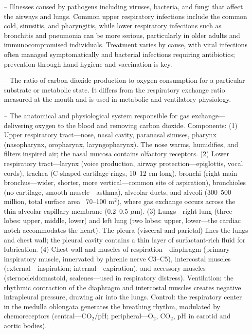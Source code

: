 -- Illnesses caused by pathogens including viruses, bacteria, and fungi that affect the airways and lungs. Common upper respiratory infections include the common cold, sinusitis, and pharyngitis, while lower respiratory infections such as bronchitis and pneumonia can be more serious, particularly in older adults and immunocompromised individuals. Treatment varies by cause, with viral infections often managed symptomatically and bacterial infections requiring antibiotics; prevention through hand hygiene and vaccination is key.

-- The ratio of carbon dioxide production to oxygen consumption for a particular substrate or metabolic state. It differs from the respiratory exchange ratio measured at the mouth and is used in metabolic and ventilatory physiology.

-- The anatomical and physiological system responsible for gas exchange—delivering oxygen to the blood and removing carbon dioxide. Components: (1) Upper respiratory tract—nose, nasal cavity, paranasal sinuses, pharynx (nasopharynx, oropharynx, laryngopharynx). The nose warms, humidifies, and filters inspired air; the nasal mucosa contains olfactory receptors. (2) Lower respiratory tract—larynx (voice production, airway protection—epiglottis, vocal cords), trachea (C-shaped cartilage rings, 10--12 cm long), bronchi (right main bronchus—wider, shorter, more vertical—common site of aspiration), bronchioles (no cartilage, smooth muscle—asthma), alveolar ducts, and alveoli (300--500 million, total surface area ~70--100 m\(^2\)), where gas exchange occurs across the thin alveolar-capillary membrane (0.2--0.5 \(\mu\)m). (3) Lungs—right lung (three lobes: upper, middle, lower) and left lung (two lobes: upper, lower—the cardiac notch accommodates the heart). The pleura (visceral and parietal) lines the lungs and chest wall; the pleural cavity contains a thin layer of surfactant-rich fluid for lubrication. (4) Chest wall and muscles of respiration—diaphragm (primary inspiratory muscle, innervated by phrenic nerve C3--C5), intercostal muscles (external—inspiration; internal—expiration), and accessory muscles (sternocleidomastoid, scalenes—used in respiratory distress). Ventilation: the rhythmic contraction of the diaphragm and intercostal muscles creates negative intrapleural pressure, drawing air into the lungs. Control: the respiratory center in the medulla oblongata generates the breathing rhythm, modulated by chemoreceptors (central—CO$_2$/pH; peripheral—O$_2$, CO$_2$, pH in carotid and aortic bodies).

